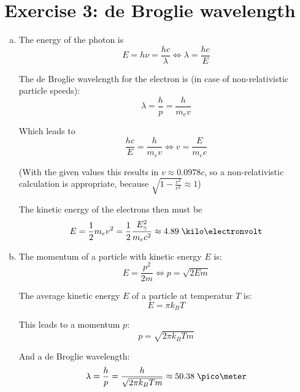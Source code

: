 \documentclass[a4paper,german,12pt,smallheadings]{scrartcl}
\begin{document}
\section*{Exercise 3: de Broglie wavelength}

\begin{enumerate}[a)]
  \item
    The energy of the photon is
    \begin{equation*}
      E = h \nu = \frac{hc}{\lambda} \Leftrightarrow \lambda = \frac{hc}{E}
    \end{equation*}

    The de Broglie wavelength for the electron is (in case of non-relativistic particle speeds):
    \begin{equation*}
      \lambda = \frac{h}{p} = \frac{h}{m_e v}
    \end{equation*}

    Which leads to
    \begin{equation*}
      \frac{hc}{E} = \frac{h}{m_e v} \Leftrightarrow v = \frac{E}{m_e c}
    \end{equation*}

    (With the given values this results in $v \approx 0.0978 c$, so a
    non-relativistic calculation is appropriate, because $\sqrt{1 -
    \frac{v^2}{c^2}} \approx 1$)

    The kinetic energy of the electrons then must be
    \begin{equation*}
      E = \frac{1}{2} m_ev^2 = \frac{1}{2} \frac{E_\gamma^2}{m_e c^2} \approx 4.89 \; \kilo\electronvolt
    \end{equation*}
  \item
    The momentum of a particle with kinetic energy $E$ is:
    \begin{equation*}
      E = \frac{p^2}{2m} \Leftrightarrow p = \sqrt{2 E m}
    \end{equation*}

    The average kinetic energy $E$ of a particle at temperatur $T$ is:
    \begin{equation*}
      E = \pi k_B T
    \end{equation*}

    This leads to a momentum $p$:
    \begin{equation*}
      p = \sqrt{2 \pi k_B T m}
    \end{equation*}

    And a de Broglie wavelength:
    \begin{equation*}
      \lambda = \frac{h}{p} = \frac{h}{\sqrt{2 \pi k_B T m}} \approx 50.38 \; \pico\meter
    \end{equation*}


\end{enumerate}
\end{document}
